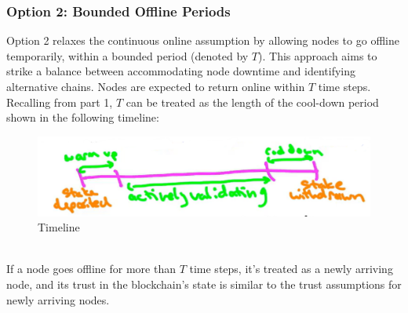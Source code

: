 \subsubsection{Option 2: Bounded Offline Periods}
Option 2 relaxes the continuous online assumption by allowing nodes to go offline temporarily, within a bounded period (denoted by $T$). This approach aims to strike a balance between accommodating node downtime and identifying alternative chains. Nodes are expected to return online within $T$ time steps.\\
Recalling from part 1, $T$ can be treated as the length of the cool-down period shown in the following timeline:\\
\begin{figure}[h]
    \centering
    \includegraphics[scale = 0.5]{figures/f60.png}
    \caption{Timeline}
    \label{fig:mesh1}
\end{figure}\\
If a node goes offline for more than $T$ time steps, it's treated as a newly arriving node, and its trust in the blockchain's state is similar to the trust assumptions for newly arriving nodes.\\


